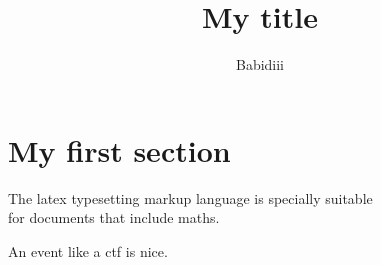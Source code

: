 \documentclass[12pt,french]{article}
\author{Babidiii}
\title{My title}
\begin{document}

\setcounter{page}{2}

\tableofcontents \clearpage
\listoffigures \clearpage
\lstlistoflistings 
\listoftables \clearpage

\section{My first section}

The \Gls{latex} typesetting markup language is specially suitable \\
for documents that include \gls{maths}. 

An event like a \gls{ctf} is nice.

\clearpage
\printnoidxglossaries
\end{document}
